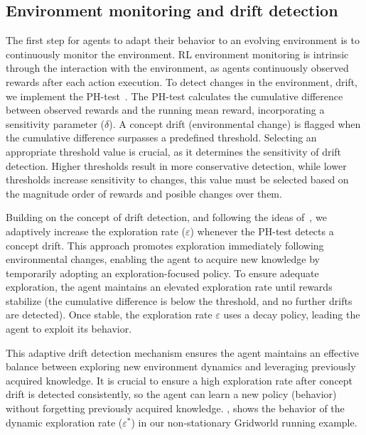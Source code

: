 \subsection{Environment monitoring and drift detection}

The first step for agents to adapt their behavior to an evolving environment is to continuously monitor 
the environment. \ac{RL} environment monitoring is intrinsic through the interaction with the 
environment, as agents continuously observed rewards after each action execution. To detect 
changes in the environment, \ie drift, we implement the 
PH-test~\cite{mignon2017adaptive,networkdynamicrl}. The PH-test calculates the cumulative 
difference between observed rewards and the running mean reward, incorporating a sensitivity 
parameter ($\delta$). A concept drift (environmental change) is flagged when the cumulative 
difference surpasses a predefined threshold. Selecting an appropriate threshold value is crucial, as it 
determines the sensitivity of drift detection. Higher thresholds result in more conservative detection, 
while lower thresholds increase sensitivity to changes, this value must be selected based on the 
magnitude order of rewards and posible changes over them.

Building on the concept of drift detection, and following the ideas of~\citet{mignon2017adaptive}, we 
adaptively increase the exploration rate ($\varepsilon$) whenever the PH-test detects a concept drift. 
This approach promotes exploration immediately following environmental changes, enabling the agent 
to acquire new knowledge by temporarily adopting an exploration-focused policy. To ensure adequate 
exploration, the agent maintains an elevated exploration rate until rewards stabilize (\ie the cumulative 
difference is below the threshold, and  no further drifts are detected). Once stable, the exploration rate 
$\varepsilon$ uses a decay policy, leading the agent to exploit its behavior.

This adaptive drift detection mechanism ensures the agent maintains an effective balance between 
exploring new environment dynamics and leveraging previously acquired knowledge. It is crucial to 
ensure a high exploration rate after concept drift is detected consistently, so the agent can learn a 
new policy (\ie behavior) without forgetting previously acquired knowledge. , 
shows the behavior of the dynamic exploration rate ($\varepsilon^*$) in our non-stationary Gridworld 
running example.

